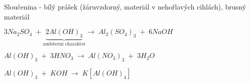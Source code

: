 Sloučenina  - bílý prášek (žáruvzdorný, materiál v nehořlavých cihlách), brusný materiál

$3Na_2SO_4 \; + \underbrace{2Al(OH)_3}_\text{amfoterní charakter} \longrightarrow  \; Al_2(SO_4)_3 \; + \; 6NaOH$

\vspace{1em}

$Al(OH)_3 \; + \; 3HNO_3 \; \to \; Al(NO_3)_3 \; + \; 3H_2O$

$Al(OH)_3 \; + \; KOH \; \to \;  K[Al(OH)_4]$